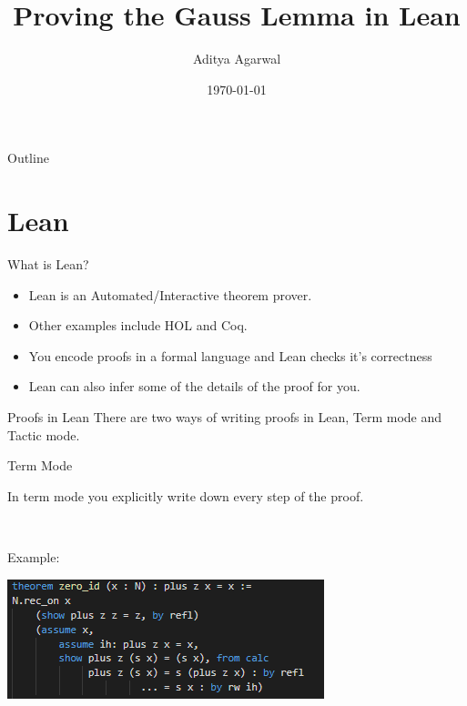 \documentclass{beamer}
\begin{document}
\title{Proving the Gauss Lemma in Lean}

\author{Aditya Agarwal}


\date{\today}

\begin{frame}
  \titlepage
\end{frame}


\begin{frame}{Outline}
  \tableofcontents
\end{frame}

\section {Lean}

\begin{frame}{What is Lean?} 
    \begin{itemize}
        \item Lean is an Automated/Interactive theorem prover.
        \item Other examples include HOL and Coq.
        \item You encode proofs in a formal language and Lean checks it's correctness
        \item Lean can also infer some of the details of the proof for you.
    \end{itemize}         
\end{frame}

\begin{frame}{Proofs in Lean} 
  There are two ways of writing proofs in Lean, Term mode and Tactic mode. 

\end{frame}


\begin{frame}{Term Mode} 

  In term mode you explicitly write down every step of the proof. 

  \

  Example:

  \includegraphics{term_example.png}

\end{frame}
\end{document}
